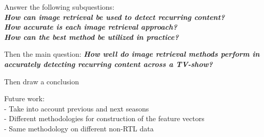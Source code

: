 \documentclass{article}
\begin{document}
Answer the following subquestions:
\\
\textit{\textbf{How can image retrieval be used to detect recurring content?\newline}}\\
\textit{\textbf{How accurate is each image retrieval approach?\newline}}\\
\textit{\textbf{How can the best method be utilized in practice?\newline}}

Then the main question:
\textit{\textbf{How well do image retrieval methods perform in accurately detecting recurring content across a TV-show?\newline}}

Then draw a conclusion

Future work: \\
- Take into account previous and next seasons\\
- Different methodologies for construction of the feature vectors\\
- Same methodology on different non-RTL data\\



\end{document}
